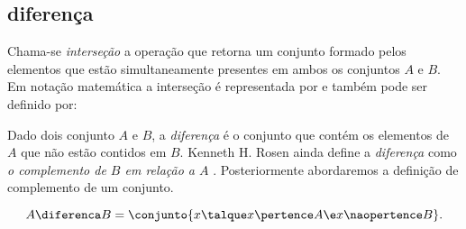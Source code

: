 \subsection{diferença}

Chama-se \emph{interseção} a operação que retorna um conjunto formado pelos elementos que estão simultaneamente presentes em ambos os conjuntos $A$ e $B$. Em notação matemática a interseção é representada por \entreaspas{$\inter$} e também pode ser definido por:  

Dado dois conjunto $A$ e $B$, a \emph{diferença} é o conjunto que contém os elementos de $A$ que não estão contidos em $B$. Kenneth H. Rosen ainda define a \emph{diferença} como \emph{o complemento de $B$ em relação a $A$} \cite[pp. 123]{kenneth2010}. Posteriormente abordaremos a definição de complemento de um conjunto.

\[
	A \diferenca B = \conjunto{ x \talque  x \pertence A \e x \naopertence B}.
\]
